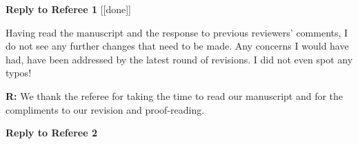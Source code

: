 \documentclass[12pt]{letter}
\newenvironment{refquote}{\bigskip \begin{it}}{\end{it}\smallskip}
\begin{document}









\clearpage

{\Large \bf Reply to Referee 1} [[done]]

	\begin{refquote}
	Having read the manuscript and the response to previous reviewers’ comments, I do not see any further changes that need to be made. Any concerns I would have had, have been addressed by the latest round of revisions. I did not even spot any typos!
	\end{refquote}


	\textbf{R:} We thank the referee for taking the time to read our manuscript and for the compliments to our revision and proof-reading.


\clearpage

{\Large \bf Reply to Referee 2}
\end{document}
